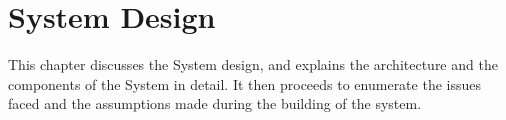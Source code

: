 \chapter{System Design}
This chapter discusses the System design, and explains the architecture and the components of the System in detail. It then proceeds to enumerate the issues faced and the assumptions made during the building of the system. 



%
%


